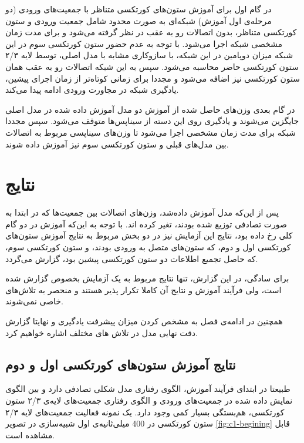 \documentclass[12pt]{report}
\begin{document}
	در گام اول برای آموزش ستون‌های کورتکسی متناظر با جمعیت‌های ورودی (دو مرحله‌ی اول آموزش) شبکه‌ای به صورت محدود شامل جمعیت ورودی و ستون کورتکسی متناظر، بدون اتصالات رو به عقب در نظر گرفته می‌شود و برای مدت زمان مشخصی شبکه اجرا می‌شود. با توجه به عدم حضور ستون کورتکسی سوم در این شبکه میزان دوپامین در این شبکه، با سازوکاری مشابه با مدل اصلی، توسط لایه ۲/۳ ستون کورتکسی حاضر محاسبه می‌شود. سپس به این شبکه اتصالات رو به عقب همان ستون کورتکسی نیز اضافه می‌شود و مجددا برای زمانی کوتاه‌تر از زمان اجرای پیشین، یادگیری شبکه در مجاورت ورودی ادامه پیدا می‌کند.
	
	در گام بعدی وزن‌های حاصل شده از آموزش دو مدل آموزش داده شده در مدل اصلی جایگزین می‌شوند و یادگیری روی این دسته از سیناپس‌ها متوقف می‌شود. سپس مجددا شبکه برای مدت زمان مشخصی اجرا می‌شود تا وزن‌های سیناپسی مربوط به اتصالات بین مدل‌های قبلی و ستون کورتکسی سوم نیز آموزش داده شوند.
	

	\section{نتایج}
	پس از این‌که مدل آموزش داده‌شد، وزن‌های اتصالات بین جمعیت‌ها که در ابتدا به صورت تصادفی توزیع شده بودند، تغیر کرده اند. با توجه به این‌که آموزش در دو گام کلی رخ داده بود، نتایج این آزمایش نیز در دو بخش مربوط به نتایج آموزش ستون‌های کورتکسی اول و دوم، که ستون‌های متصل به ورودی بودند، و ستون کورتکسی سوم، که حاصل تجمیع اطلاعات دو ستون کورتکسی پیشین بود، گزارش می‌گردد.
	
	برای سادگی، در این گزارش، تنها نتایج مربوط به یک آزمایش بخصوص گزارش شده است، ولی فرآیند آموزش و نتایج آن کاملا تکرار پذیر هستند و منحصر به تلاش‌های خاصی نمی‌شوند.
	
	همچنین در ادامه‌ی فصل به مشخص کردن میزان پیشرفت یادگیری و نهایتا گزارش دقت نهایی مدل در تلاش ها‌ی مختلف اشاره خواهیم کرد.
	
	\subsection{نتایج آموزش ستون‌های کورتکسی اول و دوم}
	طبیعتا در ابتدای فرآیند آموزش، الگوی رفتاری مدل شکلی تصادفی دارد و بین الگوی نمایش داده شده در جمعیت‌های ورودی و الگوی رفتاری جمعیت‌های لایه‌ی ۲/۳ ستون کورتکسی، هم‌بستگی بسیار کمی وجود دارد. یک نمونه فعالیت جمعیت‌های لایه‌ ۲/۳ ستون کورتکسی در 400 میلی‌ثانیه‌ی اول شبیه‌سازی در تصویر ‌\ref{fig:c1-begining} قابل مشاهده است.
	
\end{document}
